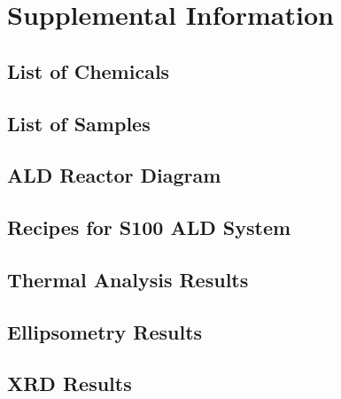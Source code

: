 \chapter{Supplemental Information}
\label{ch:appendix}
\thispagestyle{empty}

\section{List of Chemicals}

\section{List of Samples}

\section{ALD Reactor Diagram}

\section{Recipes for S100 ALD System}

\section{Thermal Analysis Results}

\section{Ellipsometry Results}
\label{sup:Ellipsometry}

\section{XRD Results}

